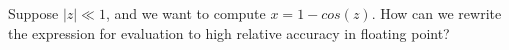 \documentclass[12pt, leqno]{article}
\begin{document}

Suppose $|z| \ll 1$, and we want to compute $x = 1-cos(z)$.
How can we rewrite the expression for evaluation to high relative accuracy
in floating point?
\end{document}
